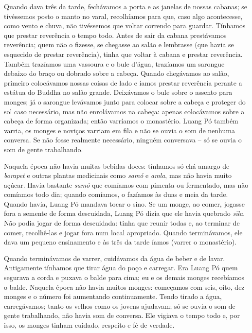 Quando dava três da tarde, fechávamos a porta e as janelas de nossas
cabanas; se tivéssemos posto o manto no varal, recolhíamos para que,
caso algo acontecesse, como vento e chuva, não tivéssemos que voltar
correndo para guardar. Tínhamos que prestar reverência o tempo todo.
Antes de sair da cabana prestávamos reverência; quem não o fizesse, se
chegasse ao salão e lembrasse (que havia se esquecido de prestar
reverência), tinha que voltar à cabana e prestar reverência. Também
trazíamos uma vassoura e o bule d'água, trazíamos um sarongue debaixo do
braço ou dobrado sobre a cabeça. Quando chegávamos ao salão, primeiro
colocávamos nossas coisas de lado e íamos prestar reverência perante a
estátua do Buddha no salão grande. Deixávamos o bule sobre o assento
para monges; já o sarongue levávamos junto para colocar sobre a cabeça e
proteger do sol caso necessário, mas não enrolávamos na cabeça: apenas
colocávamos sobre a cabeça de forma organizada; então varríamos o
monastério. Luang Pó também varria, os monges e noviços varriam em fila
e não se ouvia o som de nenhuma conversa. Se não fosse realmente
necessário, ninguém conversava -- só se ouvia o som de gente
trabalhando.

Naquela época não havia muitas bebidas doces: tínhamos só chá amargo de
\emph{borapet} e outras plantas medicinais como \emph{samó} e
\emph{amla}, mas não havia muito açúcar. Havia bastante \emph{samó} que
comíamos com pimenta ou fermentado, mas não comíamos todo dia; quando
comíamos, o fazíamos às duas e meia da tarde. Quando havia, Luang Pó
mandava tocar o sino. Se um monge, ao comer, jogasse fora a semente de
forma descuidada, Luang Pó dizia que ele havia quebrado \emph{sīla}. Não
podia jogar de forma descuidada: tinha que reunir todas e, ao terminar
de comer, recolhê-las e jogar fora num local apropriado. Quando
terminávamos, ele dava um pequeno ensinamento e às três da tarde íamos
(varrer o monastério).

Quando terminávamos de varrer, cuidávamos da água de beber e de lavar.
Antigamente tínhamos que tirar água do poço e carregar. Era Luang Pó
quem segurava a corda e puxava o balde para cima; eu e os demais monges
recebíamos o balde. Naquela época não havia muitos monges: começamos com
seis, oito, dez monges e o número foi aumentando continuamente. Tendo
tirado a água, carregávamos; tanto os velhos como os jovens ajudavam; só
se ouvia o som de gente trabalhando, não havia som de conversa. Ele
vigiava o tempo todo e, por isso, os monges tinham cuidado, respeito e
fé de verdade.

